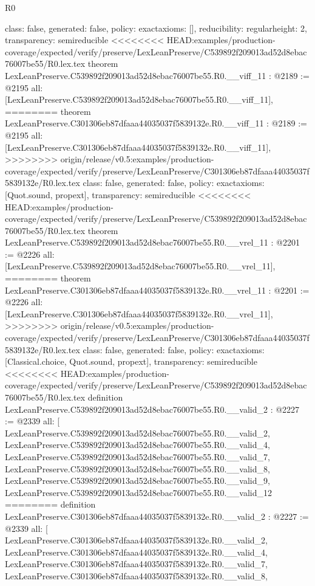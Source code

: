 \begin{lexlean}{R0}
\begin{coremodule}
{{{{{{{{{{{{{{{{{{{{{{{{{{{{{{{{{{{{{{{{{{  class: false,
  generated: false,
  policy: exact{axioms: []},
  reducibility: regular{height: 2},
  transparency: semireducible
}
<<<<<<<< HEAD:examples/production-coverage/expected/verify/preserve/LexLeanPreserve/C539892f209013ad52d8ebac76007be55/R0.lex.tex
theorem LexLeanPreserve.C539892f209013ad52d8ebac76007be55.R0.__viff_11 : @2189 := @2195 {
  all: [LexLeanPreserve.C539892f209013ad52d8ebac76007be55.R0.__viff_11],
========
theorem LexLeanPreserve.C301306eb87dfaaa44035037f5839132e.R0.__viff_11 : @2189 := @2195 {
  all: [LexLeanPreserve.C301306eb87dfaaa44035037f5839132e.R0.__viff_11],
>>>>>>>> origin/release/v0.5:examples/production-coverage/expected/verify/preserve/LexLeanPreserve/C301306eb87dfaaa44035037f5839132e/R0.lex.tex
  class: false,
  generated: false,
  policy: exact{axioms: [Quot.sound, propext]},
  transparency: semireducible
}
<<<<<<<< HEAD:examples/production-coverage/expected/verify/preserve/LexLeanPreserve/C539892f209013ad52d8ebac76007be55/R0.lex.tex
theorem LexLeanPreserve.C539892f209013ad52d8ebac76007be55.R0.__vrel_11 : @2201 := @2226 {
  all: [LexLeanPreserve.C539892f209013ad52d8ebac76007be55.R0.__vrel_11],
========
theorem LexLeanPreserve.C301306eb87dfaaa44035037f5839132e.R0.__vrel_11 : @2201 := @2226 {
  all: [LexLeanPreserve.C301306eb87dfaaa44035037f5839132e.R0.__vrel_11],
>>>>>>>> origin/release/v0.5:examples/production-coverage/expected/verify/preserve/LexLeanPreserve/C301306eb87dfaaa44035037f5839132e/R0.lex.tex
  class: false,
  generated: false,
  policy: exact{axioms: [Classical.choice, Quot.sound, propext]},
  transparency: semireducible
}
<<<<<<<< HEAD:examples/production-coverage/expected/verify/preserve/LexLeanPreserve/C539892f209013ad52d8ebac76007be55/R0.lex.tex
definition LexLeanPreserve.C539892f209013ad52d8ebac76007be55.R0.__valid_2 : @2227 := @2339 {
  all: [
    LexLeanPreserve.C539892f209013ad52d8ebac76007be55.R0.__valid_2,
    LexLeanPreserve.C539892f209013ad52d8ebac76007be55.R0.__valid_4,
    LexLeanPreserve.C539892f209013ad52d8ebac76007be55.R0.__valid_7,
    LexLeanPreserve.C539892f209013ad52d8ebac76007be55.R0.__valid_8,
    LexLeanPreserve.C539892f209013ad52d8ebac76007be55.R0.__valid_9,
    LexLeanPreserve.C539892f209013ad52d8ebac76007be55.R0.__valid_12
========
definition LexLeanPreserve.C301306eb87dfaaa44035037f5839132e.R0.__valid_2 : @2227 := @2339 {
  all: [
    LexLeanPreserve.C301306eb87dfaaa44035037f5839132e.R0.__valid_2,
    LexLeanPreserve.C301306eb87dfaaa44035037f5839132e.R0.__valid_4,
    LexLeanPreserve.C301306eb87dfaaa44035037f5839132e.R0.__valid_7,
    LexLeanPreserve.C301306eb87dfaaa44035037f5839132e.R0.__valid_8,
}}}}}}}}}}}}}}}}}}}}}}}}}}}}}}}}}}}}}}}}}}}}}
\end{coremodule}
\end{lexlean}
